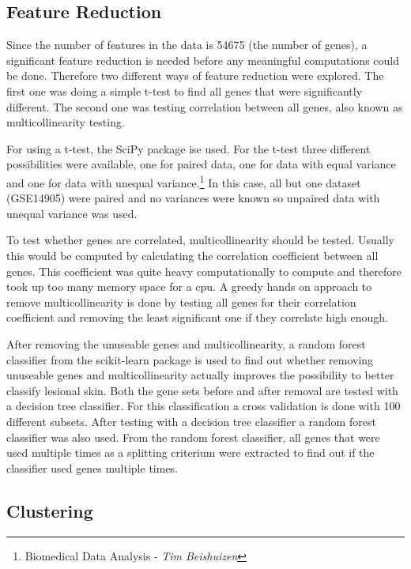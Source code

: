 \documentclass[10pt,a4paper]{article}
\begin{document}
	\subsection{Feature Reduction}
	\label{subsec:MethodsFeatureReduction}
	
	Since the number of features in the data is 54675 (the number of genes), a significant feature reduction is needed before any meaningful computations could be done. Therefore two different ways of feature reduction were explored. The first one was doing a simple t-test to find all genes that were significantly different. The second one was testing correlation between all genes, also known as multicollinearity testing.
	
	For using a t-test, the SciPy package ise used. For the t-test three different possibilities were available, one for paired data, one for data with equal variance and one for data with unequal variance.\footnote{\label{fn:BDA}Biomedical Data Analysis - \textit{Tim Beishuizen}} In this case, all but one dataset (GSE14905) were paired and no variances were known so unpaired data with unequal variance was used.
	
	To test whether genes are correlated, multicollinearity should be tested. Usually this would be computed by calculating the correlation coefficient between all genes. This coefficient was quite heavy computationally to compute and therefore took up too many memory space for a cpu. A greedy hands on approach to remove multicollinearity is done by testing all genes for their correlation coefficient and removing the least significant one if they correlate high enough.
	
	After removing the unuseable genes and multicollinearity, a random forest classifier from the scikit-learn package is used to find out whether removing unuseable genes and multicollinearity actually improves the possibility to better classify lesional skin. Both the gene sets before and after removal are tested with a decision tree classifier. For this classification a cross validation is done with 100 different subsets. After testing with a decision tree classifier a random forest classifier was also used. From the random forest classifier, all genes that were used multiple times as a splitting criterium were extracted to find out if the classifier used genes multiple times.
	
	\subsection{Clustering}
	\label{subsec:MethodsPositionalClustering}
	
\end{document}
